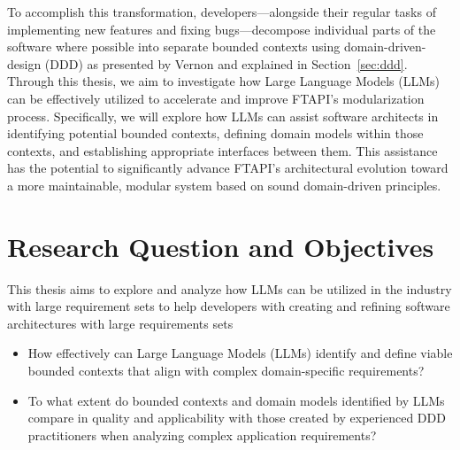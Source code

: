 To accomplish this transformation, developers—alongside their regular tasks of implementing new features and fixing bugs—decompose individual parts of the software where possible into separate bounded contexts using domain-driven-design (DDD) as presented by Vernon \autocite[p.62]{vernon2013implementing} and explained in Section~\ref{sec:ddd}. Through this thesis, we aim to investigate how Large Language Models (LLMs) can be effectively utilized to accelerate and improve FTAPI's modularization process. Specifically, we will explore how LLMs can assist software architects in identifying potential bounded contexts, defining domain models within those contexts, and establishing appropriate interfaces between them. This assistance has the potential to significantly advance FTAPI's architectural evolution toward a more maintainable, modular system based on sound domain-driven principles.

\section{Research Question and Objectives}

This thesis aims to explore and analyze how LLMs can be utilized in the industry with large requirement sets to help developers with creating and refining software architectures with large requirements sets

\begin{itemize}
    \item How effectively can Large Language Models (LLMs) identify and define viable bounded contexts that align with complex domain-specific requirements?
    \item To what extent do bounded contexts and domain models identified by LLMs compare in quality and applicability with those created by experienced DDD practitioners when analyzing complex application requirements?
\end{itemize}